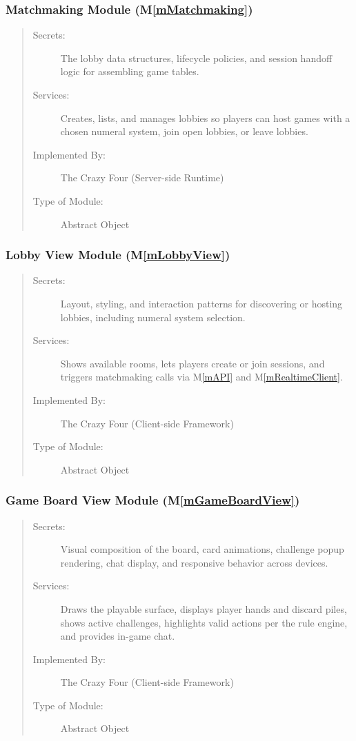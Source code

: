\documentclass[12pt, titlepage]{article}
\newcommand{\mref}[1]{M\ref{#1}}
\begin{document}
\subsubsection{Matchmaking Module (\mref{mMatchmaking})}
\begin{quote}
\begin{description}
  \item[Secrets:] The lobby data structures, lifecycle policies, and session handoff logic for assembling game tables.
  \item[Services:] Creates, lists, and manages lobbies so players can host games with a chosen numeral system, join open lobbies, or leave lobbies.
  \item[Implemented By:] The Crazy Four (Server-side Runtime)
  \item[Type of Module:] Abstract Object
\end{description}
\end{quote}

\subsubsection{Lobby View Module (\mref{mLobbyView})}
\begin{quote}
\begin{description}
  \item[Secrets:] Layout, styling, and interaction patterns for discovering or hosting lobbies, including numeral system selection.
  \item[Services:] Shows available rooms, lets players create or join sessions, and triggers matchmaking calls via \mref{mAPI} and \mref{mRealtimeClient}.
  \item[Implemented By:] The Crazy Four (Client-side Framework)
  \item[Type of Module:] Abstract Object
\end{description}
\end{quote}

\subsubsection{Game Board View Module (\mref{mGameBoardView})}
\begin{quote}
\begin{description}
  \item[Secrets:] Visual composition of the board, card animations, challenge popup rendering, chat display, and responsive behavior across devices.
  \item[Services:] Draws the playable surface, displays player hands and discard piles, shows active challenges, highlights valid actions per the rule engine, and provides in-game chat.
  \item[Implemented By:] The Crazy Four (Client-side Framework)
  \item[Type of Module:] Abstract Object
\end{description}
\end{quote}
\end{document}
